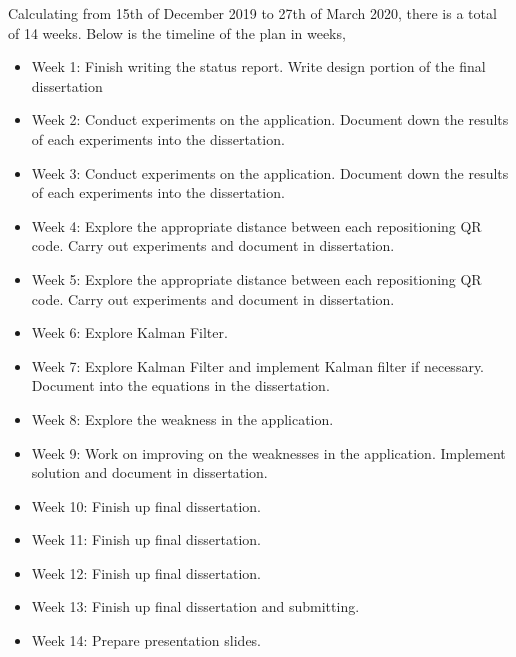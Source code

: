\documentclass[11pt]{article}
\begin{document}
Calculating from 15th of December 2019 to 27th of March 2020, there is a total of 14 weeks. Below is the timeline of the plan in weeks,

\begin{itemize}
  \item Week 1: Finish writing the status report. Write design portion of the final dissertation
  \item Week 2: Conduct experiments on the application. Document down the results of each experiments into the dissertation.
  \item Week 3: Conduct experiments on the application. Document down the results of each experiments into the dissertation.
  \item Week 4: Explore the appropriate distance between each repositioning QR code. Carry out experiments and document in dissertation.
  \item Week 5: Explore the appropriate distance between each repositioning QR code. Carry out experiments and document in dissertation.
  \item Week 6: Explore Kalman Filter.
  \item Week 7: Explore Kalman Filter and implement Kalman filter if necessary. Document into the equations in the dissertation.
  \item Week 8: Explore the weakness in the application.
  \item Week 9: Work on improving on the weaknesses in the application. Implement solution and document in dissertation.
  \item Week 10: Finish up final dissertation.
  \item Week 11: Finish up final dissertation.
  \item Week 12: Finish up final dissertation.
  \item Week 13: Finish up final dissertation and submitting.
  \item Week 14: Prepare presentation slides.
\end{itemize}




    
    
    
\end{document}
